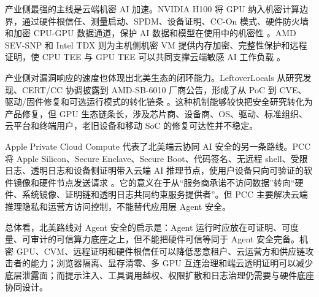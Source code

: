 产业侧最强的主线是云端机密 AI 加速。NVIDIA H100 将 GPU 纳入机密计算边界，通过硬件根信任、测量启动、SPDM、设备证明、CC-On 模式、硬件防火墙和加密 CPU-GPU 数据通道，保护 AI 数据和模型在使用中的机密性 \cite{nvidiah100cc2023}。AMD SEV-SNP 和 Intel TDX 则为主机侧机密 VM 提供内存加密、完整性保护和远程证明，使 CPU TEE 与 GPU TEE 可以共同支撑云端敏感 AI 工作负载 \cite{amdsev2026,inteltdx2026}。

产业侧对漏洞响应的速度也体现出北美生态的闭环能力。LeftoverLocals 从研究发现、CERT/CC 协调披露到 AMD-SB-6010 厂商公告，形成了从 PoC 到 CVE、驱动/固件修复和可选运行模式的转化链条 \cite{certleftoverlocals2024,amdleftoverlocals2024}。这种机制能够较快把安全研究转化为产品修复，但 GPU 生态链条长，涉及芯片商、设备商、OS、驱动、标准组织、云平台和终端用户，老旧设备和移动 SoC 的修复可达性并不稳定。

Apple Private Cloud Compute 代表了北美端云协同 AI 安全的另一条路线。PCC 将 Apple Silicon、Secure Enclave、Secure Boot、代码签名、无远程 shell、受限日志、透明日志和设备侧证明带入云端 AI 推理节点，使用户设备只向可验证的软件镜像和硬件节点发送请求 \cite{applepcc2024}。它的意义在于从“服务商承诺不访问数据”转向“硬件、系统镜像、证明链和透明日志共同约束服务提供者”。但 PCC 主要解决云端推理隐私和运营方访问控制，不能替代应用层 Agent 安全。

总体看，北美路线对 Agent 安全的启示是：Agent 运行时应放在可证明、可度量、可审计的可信算力底座之上，但不能把硬件可信等同于 Agent 安全完备。机密 GPU、CVM、远程证明和硬件根信任可以降低恶意租户、云运营方和供应链攻击者的能力；浏览器隔离、显存清零、多 GPU 互连治理和端云透明证明可以减少底层泄露面；而提示注入、工具调用越权、权限扩散和日志治理仍需要与硬件底座协同设计。

